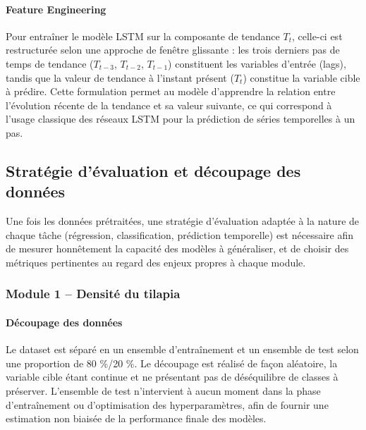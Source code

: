 \documentclass[a4paper,12pt, oneside]{article}
\begin{document}
\paragraph{Feature Engineering\\}
Pour entraîner le modèle LSTM sur la composante de tendance $T_t$, celle-ci est restructurée selon une approche de fenêtre glissante : les trois derniers pas de temps de tendance ($T_{t-3}$, $T_{t-2}$, $T_{t-1}$) constituent les variables d'entrée (lags), tandis que la valeur de tendance à l'instant présent ($T_t$) constitue la variable cible à prédire. Cette formulation permet au modèle d'apprendre la relation entre l'évolution récente de la tendance et sa valeur suivante, ce qui correspond à l'usage classique des réseaux LSTM pour la prédiction de séries temporelles à un pas.

\subsection{Stratégie d'évaluation et découpage des données}

Une fois les données prétraitées, une stratégie d'évaluation adaptée à la nature de chaque tâche (régression, classification, prédiction temporelle) est nécessaire afin de mesurer honnêtement la capacité des modèles à généraliser, et de choisir des métriques pertinentes au regard des enjeux propres à chaque module.

\subsubsection[Densité du tilapia]{Module 1 -- Densité du tilapia\\}
\paragraph{Découpage des données\\}
Le dataset est séparé en un ensemble d'entraînement et un ensemble de test selon une proportion de 80 \%/20 \%. Le découpage est réalisé de façon aléatoire, la variable cible étant continue et ne présentant pas de déséquilibre de classes à préserver. L'ensemble de test n'intervient à aucun moment dans la phase d'entraînement ou d'optimisation des hyperparamètres, afin de fournir une estimation non biaisée de la performance finale des modèles.
\end{document}
